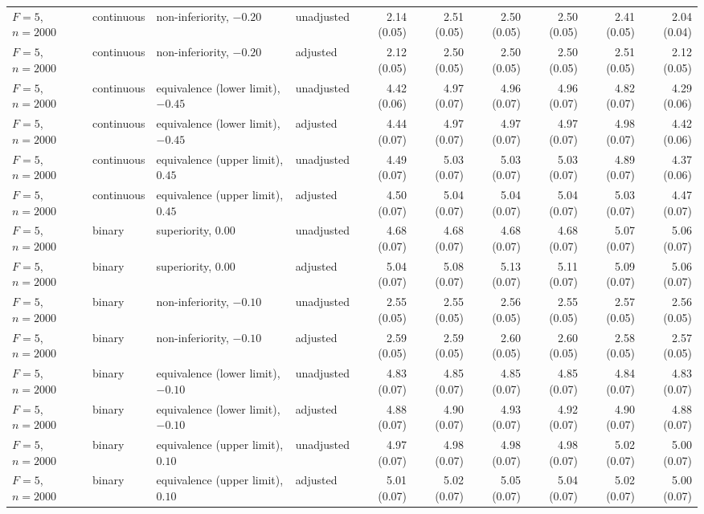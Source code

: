 \documentclass[12pt,a4paper]{article}
\theoremstyle{definition}
\theoremstyle{remark}\newtheorem{remark}{Remark}
\numberwithin{equation}{section}
\begin{document}
\begin{landscape}
\begin{singlespace}
\begin{longtable}{@{}llllrrrrrr@{}}
$F=5$, $n=2000$ & continuous & non-inferiority, $-0.20$ & unadjusted & 2.14 (0.05) & 2.51 (0.05) & 2.50 (0.05) & 2.50 (0.05) & 2.41 (0.05) & 2.04 (0.04)\\
$F=5$, $n=2000$ & continuous & non-inferiority, $-0.20$ & adjusted & 2.12 (0.05) & 2.50 (0.05) & 2.50 (0.05) & 2.50 (0.05) & 2.51 (0.05) & 2.12 (0.05)\\
$F=5$, $n=2000$ & continuous & equivalence (lower limit), $-0.45$ & unadjusted & 4.42 (0.06) & 4.97 (0.07) & 4.96 (0.07) & 4.96 (0.07) & 4.82 (0.07) & 4.29 (0.06)\\
$F=5$, $n=2000$ & continuous & equivalence (lower limit), $-0.45$ & adjusted & 4.44 (0.07) & 4.97 (0.07) & 4.97 (0.07) & 4.97 (0.07) & 4.98 (0.07) & 4.42 (0.06)\\
$F=5$, $n=2000$ & continuous & equivalence (upper limit), $0.45$ & unadjusted & 4.49 (0.07) & 5.03 (0.07) & 5.03 (0.07) & 5.03 (0.07) & 4.89 (0.07) & 4.37 (0.06)\\
$F=5$, $n=2000$ & continuous & equivalence (upper limit), $0.45$ & adjusted & 4.50 (0.07) & 5.04 (0.07) & 5.04 (0.07) & 5.04 (0.07) & 5.03 (0.07) & 4.47 (0.07)\\
$F=5$, $n=2000$ & binary & superiority, $0.00$ & unadjusted & 4.68 (0.07) & 4.68 (0.07) & 4.68 (0.07) & 4.68 (0.07) & 5.07 (0.07) & 5.06 (0.07)\\
$F=5$, $n=2000$ & binary & superiority, $0.00$ & adjusted & 5.04 (0.07) & 5.08 (0.07) & 5.13 (0.07) & 5.11 (0.07) & 5.09 (0.07) & 5.06 (0.07)\\
$F=5$, $n=2000$ & binary & non-inferiority, $-0.10$ & unadjusted & 2.55 (0.05) & 2.55 (0.05) & 2.56 (0.05) & 2.55 (0.05) & 2.57 (0.05) & 2.56 (0.05)\\
$F=5$, $n=2000$ & binary & non-inferiority, $-0.10$ & adjusted & 2.59 (0.05) & 2.59 (0.05) & 2.60 (0.05) & 2.60 (0.05) & 2.58 (0.05) & 2.57 (0.05)\\
$F=5$, $n=2000$ & binary & equivalence (lower limit), $-0.10$ & unadjusted & 4.83 (0.07) & 4.85 (0.07) & 4.85 (0.07) & 4.85 (0.07) & 4.84 (0.07) & 4.83 (0.07)\\
$F=5$, $n=2000$ & binary & equivalence (lower limit), $-0.10$ & adjusted & 4.88 (0.07) & 4.90 (0.07) & 4.93 (0.07) & 4.92 (0.07) & 4.90 (0.07) & 4.88 (0.07)\\
$F=5$, $n=2000$ & binary & equivalence (upper limit), $0.10$ & unadjusted & 4.97 (0.07) & 4.98 (0.07) & 4.98 (0.07) & 4.98 (0.07) & 5.02 (0.07) & 5.00 (0.07)\\
$F=5$, $n=2000$ & binary & equivalence (upper limit), $0.10$ & adjusted & 5.01 (0.07) & 5.02 (0.07) & 5.05 (0.07) & 5.04 (0.07) & 5.02 (0.07) & 5.00 (0.07)\\
\end{longtable}
\endgroup\end{singlespace}\end{landscape}
\end{document}
